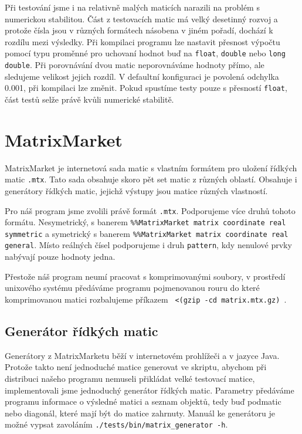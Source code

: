 Při testování jsme i na relativně malých maticích narazili na problém s numerickou stabilitou. Část z testovacích matic má velký desetinný rozvoj a protože čísla jsou v různých formátech násobena v jiném pořadí, dochází k rozdílu mezi výsledky. Při kompilaci programu lze nastavit přesnost výpočtu pomocí typu proměnné pro uchovaní hodnot buď na \texttt{float}, \texttt{double} nebo \texttt{long double}. Při porovnávání dvou matic neporovnáváme hodnoty přímo, ale sledujeme velikost jejich rozdíl. V defaultní konfiguraci je povolená odchylka 0.001, při kompilaci lze změnit. Pokud spustíme testy  pouze s přesností \texttt{float}, část testů selže právě kvůli numerické stabilitě. 


\section{MatrixMarket}
\label{MM}

MatrixMarket \cite{Boisvert:1997:MMW:265834.265854} je internetová sada matic s vlastním formátem pro uložení řídkých matic \texttt{.mtx}. Tato sada obsahuje skoro pět set matic z různých oblastí. Obsahuje i generátory řídkých matic, jejichž výstupy jsou matice různých vlastností.

Pro náš program jsme zvolili právě formát \texttt{.mtx}. Podporujeme více druhů tohoto formátu. Nesymetrický, s banerem \texttt{\%\%MatrixMarket matrix coordinate real symmetric} a symetrický s banerem \texttt{\%\%MatrixMarket matrix coordinate real general}. Místo reálných čísel podporujeme i druh \texttt{pattern}, kdy nenulové prvky nabývají pouze hodnoty jedna.

Přestože náš program neumí pracovat s komprimovanými soubory, v prostředí unixového systému předáváme programu pojmenovanou rouru do které komprimovanou matici rozbalujeme příkazem \texttt{ <(gzip -cd matrix.mtx.gz) }.

\subsection{Generátor řídkých matic}

Generátory z MatrixMarketu běží v internetovém prohlížeči a v jazyce Java. Protože takto není jednoduché matice generovat ve skriptu, abychom při distribuci našeho programu nemuseli přikládat velké testovací matice, implementovali jsme jednoduchý generátor řídkých matic. Parametry předáváme programu informace o výsledné matici a seznam objektů, tedy buď podmatic nebo diagonál, které mají být do matice zahrnuty. Manuál ke generátoru je možné vypsat zavoláním \texttt{./tests/bin/matrix\_generator -h}.    

